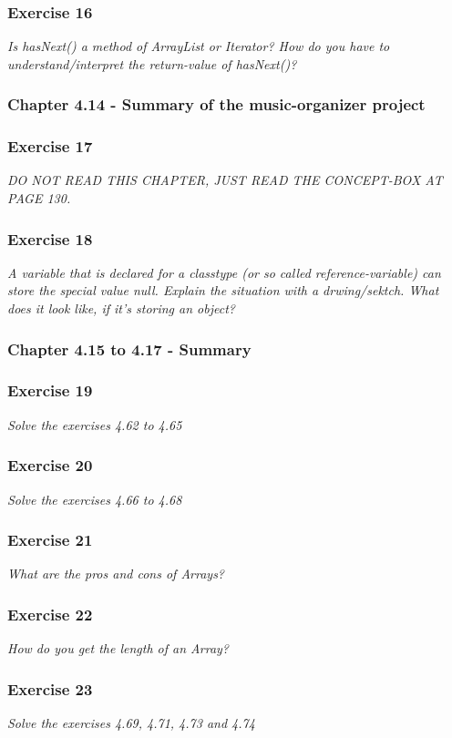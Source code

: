 \subsubsection*{Exercise 16}
\textit{Is hasNext() a method of ArrayList or Iterator? How do you have to 
understand/interpret the return-value of hasNext()?}\\

\subsubsection{Chapter 4.14 - Summary of the music-organizer project}

\subsubsection*{Exercise 17}
\textit{DO NOT READ THIS CHAPTER, JUST READ THE CONCEPT-BOX AT PAGE 130.}\\

\subsubsection*{Exercise 18}
\textit{A variable that is declared for a classtype (or so called 
reference-variable) can store the special value null. Explain the situation 
with a drwing/sektch. What does it look like, if it's storing an object?}\\

\subsubsection{Chapter 4.15 to 4.17 - Summary}

\subsubsection*{Exercise 19}
\textit{Solve the exercises 4.62 to 4.65}\\

\subsubsection*{Exercise 20}
\textit{Solve the exercises 4.66 to 4.68}\\

\subsubsection*{Exercise 21}
\textit{What are the pros and cons of Arrays?}\\

\subsubsection*{Exercise 22}
\textit{How do you get the length of an Array?}\\

\subsubsection*{Exercise 23}
\textit{Solve the exercises 4.69, 4.71, 4.73 and 4.74}\\




